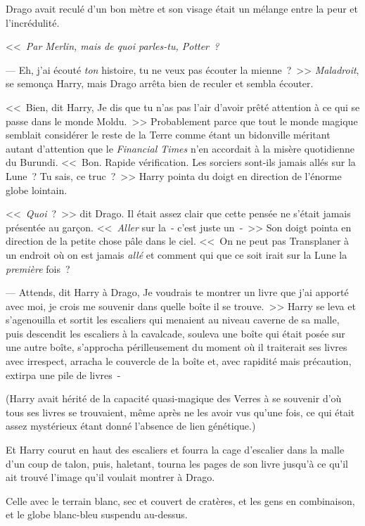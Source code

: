 Drago avait reculé d'un bon mètre et son visage était un mélange entre la peur et l'incrédulité.

<<~\emph{Par Merlin, mais de quoi parles-tu, Potter~?}

--- Eh, j'ai écouté \emph{ton} histoire, tu ne veux pas écouter la mienne~?~>> \emph{Maladroit}, se semonça Harry, mais Drago arrêta bien de reculer et sembla écouter.

<<~Bien, dit Harry, Je dis que tu n'as pas l'air d'avoir prêté attention à ce qui se passe dans le monde Moldu.~>> Probablement parce que tout le monde magique semblait considérer le reste de la Terre comme étant un bidonville méritant autant d'attention que le \emph{Financial Times} n'en accordait à la misère quotidienne du Burundi. <<~Bon. Rapide vérification. Les sorciers sont-ils jamais allés sur la Lune~? Tu sais, ce truc~?~>> Harry pointa du doigt en direction de l'énorme globe lointain.

<<~\emph{Quoi}~?~>> dit Drago. Il était assez clair que cette pensée ne s'était jamais présentée au garçon. <<~\emph{Aller} sur la~- c'est juste un~-~>> Son doigt pointa en direction de la petite chose pâle dans le ciel. <<~On ne peut pas Transplaner à un endroit où on est jamais \emph{allé} et comment qui que ce soit irait sur la Lune la \emph{première} fois~?

--- Attends, dit Harry à Drago, Je voudrais te montrer un livre que j'ai apporté avec moi, je crois me souvenir dans quelle boîte il se trouve.~>> Harry se leva et s'agenouilla et sortit les escaliers qui menaient au niveau caverne de sa malle, puis descendit les escaliers à la cavalcade, souleva une boîte qui était posée sur une autre boîte, s'approcha périlleusement du moment où il traiterait ses livres avec irrespect, arracha le couvercle de la boîte et, avec rapidité mais précaution, extirpa une pile de livres~-

(Harry avait hérité de la capacité quasi-magique des Verres à se souvenir d'où tous ses livres se trouvaient, même après ne les avoir vus qu'une fois, ce qui était assez mystérieux étant donné l'absence de lien génétique.)

Et Harry courut en haut des escaliers et fourra la cage d'escalier dans la malle d'un coup de talon, puis, haletant, tourna les pages de son livre jusqu'à ce qu'il ait trouvé l'image qu'il voulait montrer à Drago.

Celle avec le terrain blanc, sec et couvert de cratères, et les gens en combinaison, et le globe blanc-bleu suspendu au-dessus.

